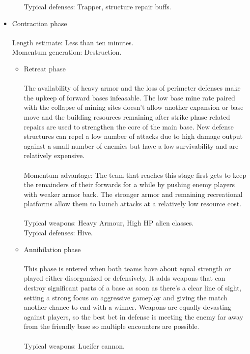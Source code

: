 \documentclass{scrartcl}
\begin{document}
\begin{itemize}
\begin{itemize}
			Typical defenses: Trapper, structure repair buffs. \\
		\end{itemize}
	\item Contraction phase \\\\
		Length estimate: Less than ten minutes. \\
		Momentum generation: Destruction. \\
		\begin{itemize}
		\item Retreat phase \\\\
			The availability of heavy armor and the loss of perimeter defenses make the upkeep of forward bases infeasable. The low base mine rate paired with the collapse of mining sites doesn't allow another expansion or base move and the building resources remaining after strike phase related repairs are used to strengthen the core of the main base. New defense structures can repel a low number of attacks due to high damage output against a small number of enemies but have a low survivability and are relatively expensive. \\\\
			Momentum advantage: The team that reaches this stage first gets to keep the remainders of their forwards for a while by pushing enemy players with weaker armor back. The stronger armor and remaining recreational platforms allow them to launch attacks at a relatively low resource cost. \\\\
			Typical weapons: Heavy Armour, High HP alien classes. \\
			Typical defenses: Hive. \\
		\item Annihilation phase \\\\
			This phase is entered when both teams have about equal strength or played either disorganized or defensively. It adds weapons that can destroy significant parts of a base as soon as there's a clear line of sight, setting a strong focus on aggressive gameplay and giving the match another chance to end with a winner. Weapons are equally devasting against players, so the best bet in defense is meeting the enemy far away from the friendly base so multiple encounters are possible. \\\\
			Typical weapons: Lucifer cannon. \\
		\end{itemize}
\end{itemize}
\end{document}
